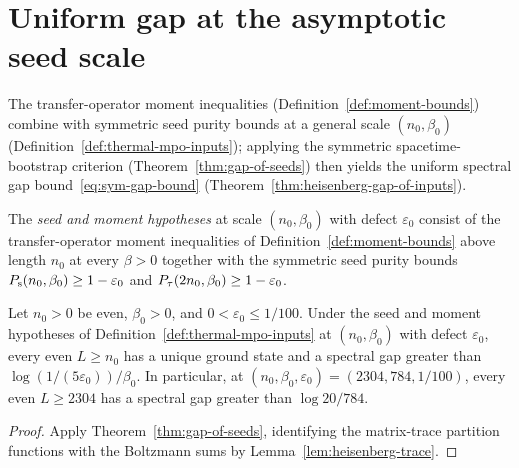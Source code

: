 \section{Uniform gap at the asymptotic seed scale}

The transfer-operator moment inequalities (Definition~\ref{def:moment-bounds}) combine with
symmetric seed purity bounds at a general scale \((n_0, \beta_0)\)
(Definition~\ref{def:thermal-mpo-inputs}); applying the symmetric spacetime-bootstrap criterion
(Theorem~\ref{thm:gap-of-seeds}) then yields the uniform spectral gap bound~\eqref{eq:sym-gap-bound}
(Theorem~\ref{thm:heisenberg-gap-of-inputs}).

\begin{definition}
  \label{def:thermal-mpo-inputs}
  \leanok
  The \emph{seed and moment hypotheses} at scale \((n_0, \beta_0)\) with defect \(\varepsilon_0\)
  consist of the transfer-operator moment inequalities of Definition~\ref{def:moment-bounds} above
  length \(n_0\) at every \(\beta > 0\) together with the symmetric seed purity bounds
  \(P_{\mathrm{s}}(n_0, \beta_0) \ge 1 - \varepsilon_0\) and \(P_{\tau}(2n_0, \beta_0) \ge 1 - \varepsilon_0\).
\end{definition}

\begin{theorem}
  \label{thm:heisenberg-gap-of-inputs}
  \leanok
  Let \(n_0 > 0\) be even, \(\beta_0 > 0\), and \(0 < \varepsilon_0 \le 1/100\). Under the seed and
  moment hypotheses of Definition~\ref{def:thermal-mpo-inputs} at \((n_0, \beta_0)\) with defect
  \(\varepsilon_0\), every even \(L \ge n_0\) has a unique ground state and a spectral gap greater
  than \(\log(1/(5\varepsilon_0))/\beta_0\). In particular, at
  \((n_0, \beta_0, \varepsilon_0) = (2304, 784, 1/100)\), every even \(L \ge 2304\) has a spectral
  gap greater than \(\log 20 / 784\).
\end{theorem}
\begin{proof}
  \leanok
  Apply Theorem~\ref{thm:gap-of-seeds}, identifying the matrix-trace partition functions with the
  Boltzmann sums by Lemma~\ref{lem:heisenberg-trace}.
\end{proof}

